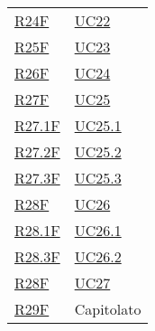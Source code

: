 \begin{center}
\begin{longtable}[!h]{p{50px} p{50px}}
        \hyperref[tab:RequisitiFunzionali]{R24F}     & \hyperref[sec:UC22]{UC22}     \\
        \hyperref[tab:RequisitiFunzionali]{R25F}     & \hyperref[sec:UC23]{UC23}     \\
        \hyperref[tab:RequisitiFunzionali]{R26F}     & \hyperref[sec:UC24]{UC24}     \\
        \hyperref[tab:RequisitiFunzionali]{R27F}     & \hyperref[sec:UC25]{UC25}     \\
        \hyperref[tab:RequisitiFunzionali]{R27.1F}   & \hyperref[sec:UC25.1]{UC25.1} \\
        \hyperref[tab:RequisitiFunzionali]{R27.2F}   & \hyperref[sec:UC25.2]{UC25.2} \\
        \hyperref[tab:RequisitiFunzionali]{R27.3F}   & \hyperref[sec:UC25.3]{UC25.3} \\
        \hyperref[tab:RequisitiFunzionali]{R28F}     & \hyperref[sec:UC26]{UC26}     \\
        \hyperref[tab:RequisitiFunzionali]{R28.1F}   & \hyperref[sec:UC26.1]{UC26.1} \\
        \hyperref[tab:RequisitiFunzionali]{R28.3F}   & \hyperref[sec:UC26.2]{UC26.2} \\
        \hyperref[tab:RequisitiFunzionali]{R28F}     & \hyperref[sec:UC27]{UC27}     \\
        \hyperref[tab:RequisitiFunzionali]{R29F}     & Capitolato                    \\



\end{longtable}
\end{center}
